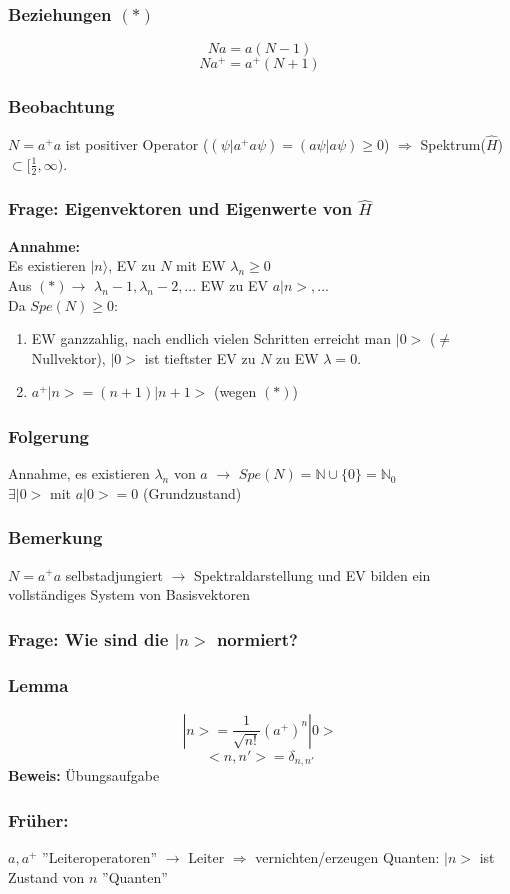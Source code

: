 \documentclass[twoside,a4paper]{scrartcl}
\renewcommand{\1}{\mathds{1}}
\newcommand{\Ra}{\Rightarrow}
\newcommand{\ra}{\rightarrow}
\renewcommand{\l}{\lambda}
\begin{document}
\subsubsection*{Beziehungen $(*)$} 
$$Na=a(N-1)$$
$$Na^+=a^+(N+1)$$
\subsubsection*{Beobachtung} 
$N=a^+a$ ist positiver Operator ($(\psi|a^+a\psi)=(a\psi|a\psi)\geq0$) $\Ra$ Spektrum($\hat H$) $\subset [\frac{1}{2},\infty)$.
\subsubsection*{Frage: Eigenvektoren und Eigenwerte von $\hat H$} 
\textbf{Annahme:}\\
Es existieren $|n\rangle$, EV zu $N$ mit EW $\l_n\geq 0$\\
Aus $(*) \ra$ $\l_n-1,\l_n-2,...$ EW zu EV $a|n>,...$\\
Da $Spe(N)\geq 0$:
\begin{enumerate}
\item EW ganzzahlig, nach endlich vielen Schritten erreicht man $|0>$ ($\neq$ Nullvektor), $|0>$ ist tieftster EV zu $N$ zu EW $\l=0$.
\item $a^+|n>=(n+1)|n+1>$ (wegen $(*)$)
\end{enumerate}
\subsubsection*{Folgerung} 
Annahme, es existieren $\l_n$ von $a$ $\ra$ $Spe(N)=\mathbb{N} \cup \{0\}=\mathbb{N}_0$\\
$\exists |0>$ mit $a|0>=0$ (Grundzustand)
\subsubsection*{Bemerkung} 
$N=a^+a$ selbstadjungiert $\ra$ Spektraldarstellung und EV bilden ein vollständiges System von Basisvektoren
\subsubsection*{Frage: Wie sind die $|n>$ normiert?} 
\subsubsection*{Lemma} 
$$|n>=\frac{1}{\sqrt{n!}}(a^+)^n|0>$$
$$<n,n'>=\delta_{n,n'}$$
\textbf{Beweis:} Übungsaufgabe
\subsubsection*{Früher:} 
$a,a^+$ ''Leiteroperatoren'' $\ra$ Leiter $\Ra$ vernichten/erzeugen Quanten: $|n>$ ist Zustand von $n$ ''Quanten''
\end{document}

